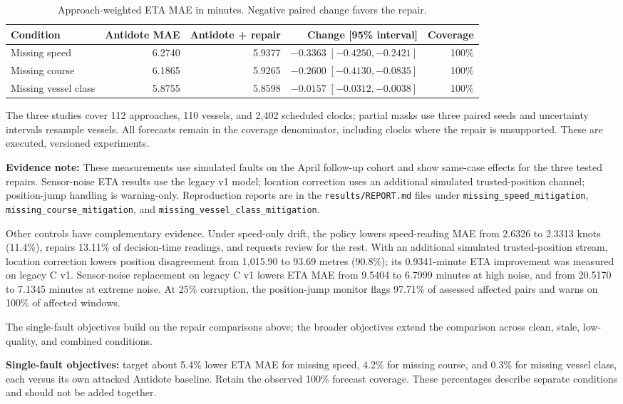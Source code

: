 \documentclass[11pt]{article}
\begin{document}
\begin{table}[ht]
\centering
\small
\begin{tabular}{@{}lrrrr@{}}
\toprule
Condition & Antidote MAE & Antidote + repair & Change [95\% interval] & Coverage \\
\midrule
Missing speed & 6.2740 & 5.9377 & $-0.3363\;[-0.4250,-0.2421]$ & 100\% \\
Missing course & 6.1865 & 5.9265 & $-0.2600\;[-0.4130,-0.0835]$ & 100\% \\
Missing vessel class & 5.8755 & 5.8598 & $-0.0157\;[-0.0312,-0.0038]$ & 100\% \\
\bottomrule
\end{tabular}
\caption{Approach-weighted ETA MAE in minutes. Negative paired change favors the repair.}\label{tab:repair-ablation}
\end{table}

The three studies cover 112 approaches, 110 vessels, and 2,402 scheduled clocks; partial masks use three paired seeds and uncertainty intervals resample vessels. All forecasts remain in the coverage denominator, including clocks where the repair is unsupported. These are executed, versioned experiments.

\textbf{Evidence note:} These measurements use simulated faults on the April follow-up cohort and show same-case effects for the three tested repairs. Sensor-noise ETA results use the legacy v1 model; location correction uses an additional simulated trusted-position channel; position-jump handling is warning-only. Reproduction reports are in the \texttt{results/REPORT.md} files under \texttt{missing\_speed\_mitigation}, \texttt{missing\_course\_mitigation}, and \texttt{missing\_vessel\_class\_mitigation}.

Other controls have complementary evidence. Under speed-only drift, the policy lowers speed-reading MAE from 2.6326 to 2.3313 knots (11.4\%), repairs 13.11\% of decision-time readings, and requests review for the rest. With an additional simulated trusted-position stream, location correction lowers position disagreement from 1,015.90 to 93.69 metres (90.8\%); its 0.9341-minute ETA improvement was measured on legacy C v1. Sensor-noise replacement on legacy C v1 lowers ETA MAE from 9.5404 to 6.7999 minutes at high noise, and from 20.5170 to 7.1345 minutes at extreme noise. At 25\% corruption, the position-jump monitor flags 97.71\% of assessed affected pairs and warns on 100\% of affected windows.

The single-fault objectives build on the repair comparisons above; the broader objectives extend the comparison across clean, stale, low-quality, and combined conditions.\par
\textbf{Single-fault objectives:} target about 5.4\% lower ETA MAE for missing speed, 4.2\% for missing course, and 0.3\% for missing vessel class, each versus its own attacked Antidote baseline. Retain the observed 100\% forecast coverage. These percentages describe separate conditions and should not be added together.\par
\end{document}
